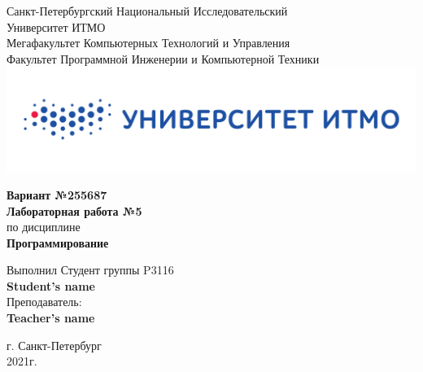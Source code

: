 \documentclass[12pt,onecolumn]{article}
\begin{document}
\setcounter{tocdepth}{4}
\begin{center}
    Санкт-Петербургский Национальный Исследовательский\\ 
    Университет ИТМО\\
    Мегафакультет Компьютерных Технологий и Управления\\
    Факультет Программной Инженерии и Компьютерной Техники \\
    \includegraphics[scale=0.3]{itm.jpg} %
\end{center}
\vspace{1cm}


\begin{center}
    \large \textbf{Вариант №255687}\\
    \textbf{Лабораторная работа №5}\\
    по дисциплине\\
    \textbf{Программирование}
\end{center}

\vspace{2cm}

\begin{flushright}
  Выполнил Студент  группы P3116\\
  \textbf{Student's name}\\
  Преподаватель: \\
  \textbf{Teacher's name}\\
\end{flushright}

\vspace{10cm}
\begin{center}
    г. Санкт-Петербург\\
    2021г.
\end{center}
\newpage
\tableofcontents
\newpage
\end{document}
